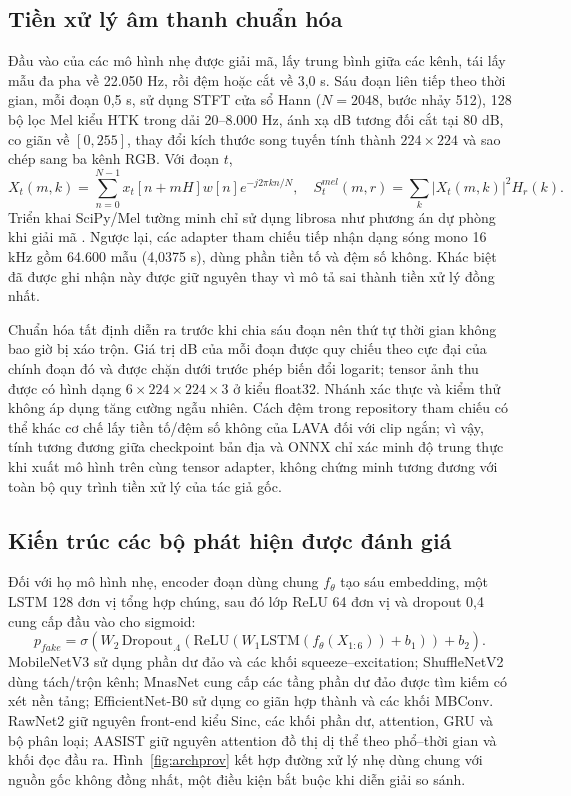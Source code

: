 \documentclass[10pt,journal,onecolumn,a4paper]{IEEEtran}
\begin{document}
\subsection{Tiền xử lý âm thanh chuẩn hóa}
Đầu vào của các mô hình nhẹ được giải mã, lấy trung bình giữa các kênh, tái lấy mẫu đa pha về 22.050 Hz, rồi đệm hoặc cắt về 3,0 s. Sáu đoạn liên tiếp theo thời gian, mỗi đoạn 0,5 s, sử dụng STFT cửa sổ Hann ($N=2048$, bước nhảy 512), 128 bộ lọc Mel kiểu HTK trong dải 20--8.000 Hz, ánh xạ dB tương đối cắt tại 80 dB, co giãn về $[0,255]$, thay đổi kích thước song tuyến tính thành $224\times224$ và sao chép sang ba kênh RGB. Với đoạn $t$,
\begin{equation}
X_t(m,k)=\sum_{n=0}^{N-1}x_t[n+mH]w[n]e^{-j2\pi kn/N},\quad S_{t}^{mel}(m,r)=\sum_k|X_t(m,k)|^2H_r(k).
\label{eq:mel}
\end{equation}
Triển khai SciPy/Mel tường minh chỉ sử dụng librosa như phương án dự phòng khi giải mã \cite{mcfee2015librosa}. Ngược lại, các adapter tham chiếu tiếp nhận dạng sóng mono 16 kHz gồm 64.600 mẫu (4,0375 s), dùng phần tiền tố và đệm số không. Khác biệt đã được ghi nhận này được giữ nguyên thay vì mô tả sai thành tiền xử lý đồng nhất.

Chuẩn hóa tất định diễn ra trước khi chia sáu đoạn nên thứ tự thời gian không bao giờ bị xáo trộn. Giá trị dB của mỗi đoạn được quy chiếu theo cực đại của chính đoạn đó và được chặn dưới trước phép biến đổi logarit; tensor ảnh thu được có hình dạng $6\times224\times224\times3$ ở kiểu float32. Nhánh xác thực và kiểm thử không áp dụng tăng cường ngẫu nhiên. Cách đệm trong repository tham chiếu có thể khác cơ chế lấy tiền tố/đệm số không của LAVA đối với clip ngắn; vì vậy, tính tương đương giữa checkpoint bản địa và ONNX chỉ xác minh độ trung thực khi xuất mô hình trên cùng tensor adapter, không chứng minh tương đương với toàn bộ quy trình tiền xử lý của tác giả gốc.

\subsection{Kiến trúc các bộ phát hiện được đánh giá}
Đối với họ mô hình nhẹ, encoder đoạn dùng chung $f_\theta$ tạo sáu embedding, một LSTM 128 đơn vị tổng hợp chúng, sau đó lớp ReLU 64 đơn vị và dropout 0,4 cung cấp đầu vào cho sigmoid:
\begin{equation}
p_{fake}=\sigma\!\left(W_2\,\mathrm{Dropout}_{.4}\!\left(\mathrm{ReLU}(W_1\mathrm{LSTM}(f_\theta(X_{1:6}))+b_1)\right)+b_2\right).
\label{eq:head}
\end{equation}
MobileNetV3 sử dụng phần dư đảo và các khối squeeze--excitation; ShuffleNetV2 dùng tách/trộn kênh; MnasNet cung cấp các tầng phần dư đảo được tìm kiếm có xét nền tảng; EfficientNet-B0 sử dụng co giãn hợp thành và các khối MBConv. RawNet2 giữ nguyên front-end kiểu Sinc, các khối phần dư, attention, GRU và bộ phân loại; AASIST giữ nguyên attention đồ thị dị thể theo phổ--thời gian và khối đọc đầu ra. Hình~\ref{fig:archprov} kết hợp đường xử lý nhẹ dùng chung với nguồn gốc không đồng nhất, một điều kiện bắt buộc khi diễn giải so sánh.
\end{document}
